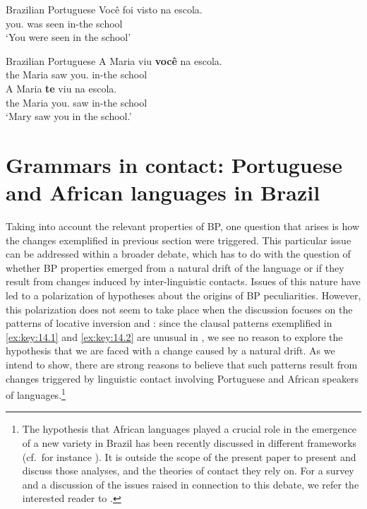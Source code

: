 \documentclass[output=paper]{langsci/langscibook}
\begin{document}
\ea%
    \label{ex:key:14.7}Brazilian Portuguese
    \sn
    \gll    Você foi visto na escola.\\
            you.\Nom{} was seen in-the school\\
    \glt    ‘You were seen in the school’\\
\z

\ea%
    \label{ex:key:14.8}Brazilian Portuguese
	\ea
	\gll    A Maria viu \textbf{você} na escola.\\
            the Maria saw you.\Nom{} in-the school\\
    \ex
    \gll    A Maria \textbf{te} viu na escola.\\
            the Maria you.\Acc{} saw in-the school\\
    \glt    ‘Mary saw you in the school.’
    \z
\z

\section{Grammars in contact: Portuguese and African languages in
Brazil}\label{sec:key:14.3}

Taking into account the relevant properties of BP, one question that arises is
how the changes exemplified in previous section were triggered. This particular
issue can be addressed within a broader debate, which has to do with the
question of whether \gls{BP} properties emerged from a natural drift of the
language or if they result from changes induced by inter-linguistic contacts.
Issues of this nature have led to a polarization of hypotheses about the
origins of \gls{BP} peculiarities. However, this polarization does not seem to
take place when the discussion focuses on the patterns of locative inversion
and : since the clausal patterns exemplified in
\eqref{ex:key:14.1} and \eqref{ex:key:14.2} are unusual in , we see no reason
to explore the hypothesis that we are faced with a change caused by a natural
drift. As we intend to show, there are strong reasons to believe that such
patterns result from changes triggered by linguistic contact involving
Portuguese and African speakers of  languages.\footnote{The hypothesis
    that African languages played a crucial role in the emergence of a new
    variety in Brazil has been recently discussed in different frameworks (cf.\
    for instance \citealt{NegraoViotti2011}). It is outside the scope of
    the present paper to present and discuss those analyses, and the theories
    of contact they rely on. For a survey and a discussion of the issues raised
in connection to this debate, we refer the interested reader to
\citet{AvelarGalves2014}.}
\end{document}
